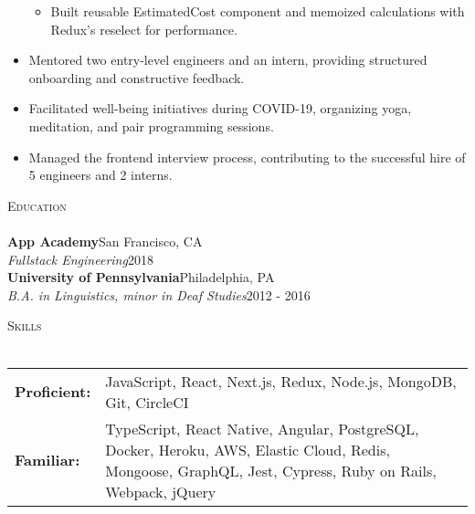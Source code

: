 \documentclass[a4paper]{article}
\newcommand{\header}[1]{
    {\hspace*{-18pt}\vspace*{3pt} \textcolor{deeppurple}{\textsc{#1}}}
    \vspace*{-12pt} \\
    \hspace*{-18pt} \textcolor{deeppurple}{\hrulefill} \\
}
\begin{document}
\begin{itemize}
\begin{itemize}
        \item Built reusable EstimatedCost component and memoized calculations with Redux's reselect for performance.
    \end{itemize}
    \item Mentored two entry-level engineers and an intern, providing structured onboarding and constructive feedback.
    \item Facilitated well-being initiatives during COVID-19, organizing yoga, meditation, and pair programming sessions.
    \item Managed the frontend interview process, contributing to the successful hire of 5 engineers and 2 interns.
\end{itemize}

\header{Education}
\textbf{App Academy}\hfill San Francisco, CA\\
\textit{Fullstack Engineering}\hfill 2018\\
\vspace{2mm}
\textbf{University of Pennsylvania}\hfill Philadelphia, PA\\
\textit{B.A. in Linguistics, minor in Deaf Studies}\hfill 2012 - 2016\\
\vspace{2mm}

\header{Skills}
\vspace{1mm}
\begin{tabular}{ l p{5in} }
    \hspace{-0.08in}\textbf{Proficient:} & JavaScript, React, Next.js, Redux, Node.js, MongoDB, Git, CircleCI \\
    \hspace{-0.08in}\textbf{Familiar:}   & TypeScript, React Native, Angular, PostgreSQL, Docker, Heroku, AWS, Elastic Cloud, Redis, Mongoose, GraphQL, Jest, Cypress, Ruby on Rails, Webpack, jQuery \\
\end{tabular}
\end{document}
